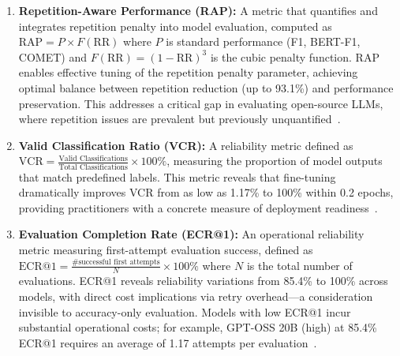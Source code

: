 \begin{enumerate}[leftmargin=*]
    \item \textbf{Repetition-Aware Performance (RAP):} A metric that quantifies and integrates repetition penalty into model evaluation, computed as $\text{RAP} = P \times F(\text{RR})$ where $P$ is standard performance (F1, BERT-F1, COMET) and $F(\text{RR}) = (1-\text{RR})^3$ is the cubic penalty function. RAP enables effective tuning of the repetition penalty parameter, achieving optimal balance between repetition reduction (up to 93.1\%) and performance preservation. This addresses a critical gap in evaluating open-source LLMs, where repetition issues are prevalent but previously unquantified~\cite{huang2025rap}.
    
    \item \textbf{Valid Classification Ratio (VCR):} A reliability metric defined as $\text{VCR} = \frac{\text{Valid Classifications}}{\text{Total Classifications}} \times 100\%$, measuring the proportion of model outputs that match predefined labels. This metric reveals that fine-tuning dramatically improves VCR from as low as 1.17\% to 100\% within 0.2 epochs, providing practitioners with a concrete measure of deployment readiness~\cite{huang2025logical}.
    
    \item \textbf{Evaluation Completion Rate (ECR@1):} An operational reliability metric measuring first-attempt evaluation success, defined as $\text{ECR@1} = \frac{\text{\# successful first attempts}}{N} \times 100\%$ where $N$ is the total number of evaluations. ECR@1 reveals reliability variations from 85.4\% to 100\% across models, with direct cost implications via retry overhead---a consideration invisible to accuracy-only evaluation. Models with low ECR@1 incur substantial operational costs; for example, GPT-OSS 20B (high) at 85.4\% ECR@1 requires an average of 1.17 attempts per evaluation~\cite{huang2026judge}.
    

\end{enumerate}
